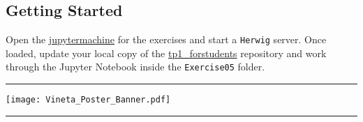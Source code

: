 \documentclass[a4paper,12pt]{article}
\begin{document}
    \subsection*{Getting Started}

    Open the \href{https://jupytermachine.etp.kit.edu}{jupytermachine} for the exercises and start a \texttt{Herwig} server. Once loaded, update your local copy of the \href{https://gitlab.etp.kit.edu/Lehre/tp1_forstudents}{tp1\_forstudents} repository and work through the Jupyter Notebook inside the \texttt{Exercise05} folder.

\vfill

\hrule
  \begin{center}
    \texttt{[image: Vineta\_Poster\_Banner.pdf]}
  \end{center}
  \noindent
  \hrule
\end{document}
